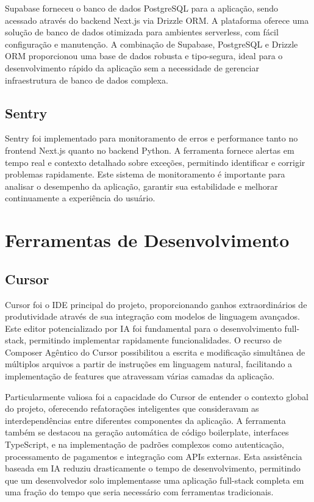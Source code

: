 \documentclass[tcc,capa]{texufpel}
\begin{document}
Supabase forneceu o banco de dados PostgreSQL para a aplicação, sendo acessado através do backend Next.js via Drizzle ORM. A plataforma oferece uma solução de banco de dados otimizada para ambientes serverless, com fácil configuração e manutenção. A combinação de Supabase, PostgreSQL e Drizzle ORM proporcionou uma base de dados robusta e tipo-segura, ideal para o desenvolvimento rápido da aplicação sem a necessidade de gerenciar infraestrutura de banco de dados complexa.

\subsection{Sentry}
Sentry foi implementado para monitoramento de erros e performance tanto no frontend Next.js quanto no backend Python. A ferramenta fornece alertas em tempo real e contexto detalhado sobre exceções, permitindo identificar e corrigir problemas rapidamente. Este sistema de monitoramento é importante para analisar o desempenho da aplicação, garantir sua estabilidade e melhorar continuamente a experiência do usuário.



\section{Ferramentas de Desenvolvimento}

\subsection{Cursor}
Cursor foi o IDE principal do projeto, proporcionando ganhos extraordinários de produtividade através de sua integração com modelos de linguagem avançados. Este editor potencializado por IA foi fundamental para o desenvolvimento full-stack, permitindo implementar rapidamente funcionalidades. O recurso de Composer Agêntico do Cursor possibilitou a escrita e modificação simultânea de múltiplos arquivos a partir de instruções em linguagem natural, facilitando a implementação de features que atravessam várias camadas da aplicação. 

Particularmente valiosa foi a capacidade do Cursor de entender o contexto global do projeto, oferecendo refatorações inteligentes que consideravam as interdependências entre diferentes componentes da aplicação. A ferramenta também se destacou na geração automática de código boilerplate, interfaces TypeScript, e na implementação de padrões complexos como autenticação, processamento de pagamentos e integração com APIs externas. Esta assistência baseada em IA reduziu drasticamente o tempo de desenvolvimento, permitindo que um desenvolvedor solo implementasse uma aplicação full-stack completa em uma fração do tempo que seria necessário com ferramentas tradicionais.
\end{document}
